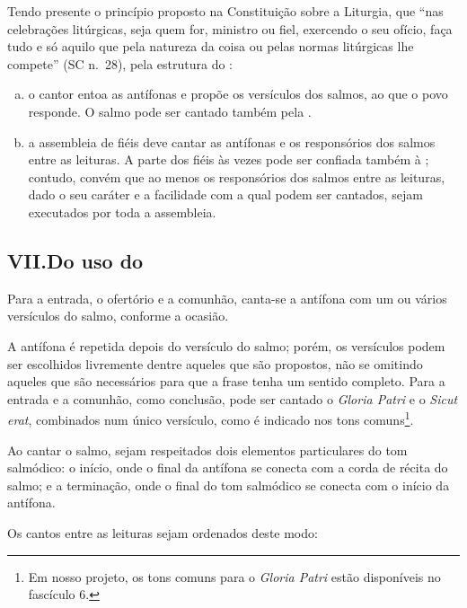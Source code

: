  Tendo presente o princípio proposto na Constituição sobre a Liturgia, que ``nas celebrações litúrgicas, seja quem for, ministro ou fiel, exercendo o seu ofício, faça tudo e só aquilo que pela natureza da coisa ou pelas normas litúrgicas lhe compete'' (SC n.\ 28), pela estrutura do {\GS}:
\begin{enumerate}[a)]
  \item o cantor entoa as antífonas e propõe os versículos dos salmos, ao que o povo responde. O salmo pode ser cantado também pela {\Schola}.

  \item a assembleia de fiéis deve cantar as antífonas e os responsórios dos salmos entre as leituras. A parte dos fiéis às vezes pode ser confiada também à {\Schola}; contudo, convém que ao menos os responsórios dos salmos entre as leituras, dado o seu caráter e a facilidade com a qual podem ser cantados, sejam executados por toda a assembleia.
\end{enumerate}

\subsection{VII.\@ Do uso do {\GS}}
 Para a entrada, o ofertório e a comunhão, canta-se a antífona com um ou vários versículos do salmo, conforme a ocasião.

A antífona é repetida depois do versículo do salmo; porém, os versículos podem ser escolhidos livremente dentre aqueles que são propostos, não se omitindo aqueles que são necessários para que a frase tenha um sentido completo. Para a entrada e a comunhão, como conclusão, pode ser cantado o \textcolor{gregoriocolor}{\emph{Gloria Patri}} e o \textcolor{gregoriocolor}{\emph{Sicut erat}}, combinados num único versículo, como é indicado nos tons comuns\footnote{Em nosso projeto, os tons comuns para o \textcolor{gregoriocolor}{\emph{Gloria Patri}} estão disponíveis no fascículo 6.}.

Ao cantar o salmo, sejam respeitados dois elementos particulares do tom salmódico: o início, onde o final da antífona se conecta com a corda de récita do salmo; e a terminação, onde o final do tom salmódico se conecta com o início da antífona.

 Os cantos entre as leituras sejam ordenados deste modo:

